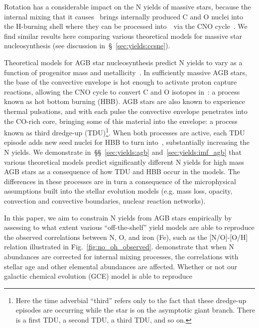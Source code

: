 \documentclass[ms.tex]{subfiles}
\begin{document}
Rotation has a considerable impact on the N yields of massive stars, because the
internal mixing that it causes~\citep{Zahn1992, Maeder1998, Lagarde2012} brings
internally produced C and O nuclei into the H-burning shell where they can be
processed into~\Nfourteen~via the CNO cycle~\citep{Heger2010, Frischknecht2016,
Andrews2017}.
We find similar results here comparing various theoretical models for
massive star nucleosynthesis (see discussion in~\S~\ref{sec:yields:ccsne}).
\par
Theoretical models for AGB star nucleosynthesis predict N yields to vary as a
function of progenitor mass and metallicity~\citep{Cristallo2011, Cristallo2015,
Karakas2010, Karakas2016, Karakas2018, Ventura2013, Ventura2014, Ventura2018,
Ventura2020}.
In sufficiently massive AGB stars, the base of the convective envelope is hot
enough to activate proton capture reactions, allowing the CNO cycle to convert
C and O isotopes in~\Nfourteen: a process known as hot bottom burning (HBB).
AGB stars are also known to experience thermal pulsations, and with each pulse
the convective envelope penetrates into the CO-rich core, bringing some of this
material into the envelope: a process known as third dredge-up (TDU)\footnote{
	Here the time adverbial ``third'' refers only to the fact that these
	dredge-up episodes are occurring while the star is on the asymptotic giant
	branch. There is a first TDU, a second TDU, a third TDU, and so on.
}.
When both processes are active, each TDU episode adds new seed nuclei for HBB to
turn into~\Nfourteen, substantially increasing the N yields.
We demonstrate in~\S\S~\ref{sec:yields:agb} and~\ref{sec:yields:imf_agb} that
various theoretical models predict significantly different N yields for high
mass AGB stars as a consequence of how TDU and HBB occur in the models.
The differences in these processes are in turn a consequence of the
microphysical assumptions built into the stellar evolution models (e.g. mass
loss, opacity, convection and convective boundaries, nuclear reaction networks).
\par
In this paper, we aim to constrain N yields from AGB stars empirically by
assessing to what extent various ``off-the-shelf'' yield models are able to
reproduce the observed correlations between N, O, and iron (Fe), such as the
[N/O]-[O/H] relation illustrated in Fig.~\ref{fig:no_oh_observed}.
\citet{Vincenzo2021} demonstrate that when N abundances are corrected for
internal mixing processes, the correlations with stellar age and other
elemental abundances are affected.
Whether or not our galactic chemical evolution (GCE) model is able to reproduce
\end{document}
